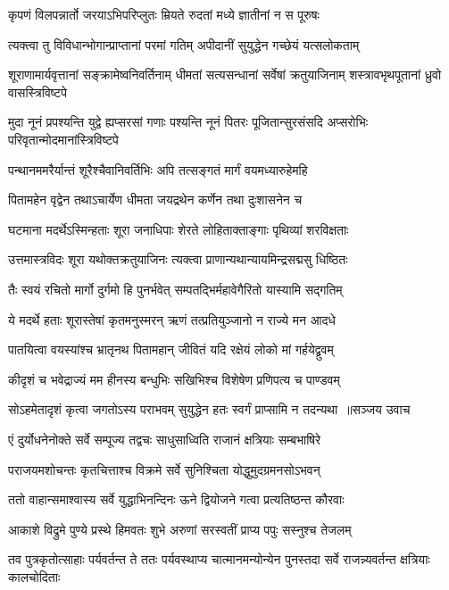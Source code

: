 \twolineshloka
{कृपणं विलपन्नार्तो जरयाऽभिपरिप्लुतः}
{म्रियते रुदतां मध्ये ज्ञातीनां न स पूरुषः}


\twolineshloka
{त्यक्त्वा तु विविधान्भोगान्प्राप्तानां परमां गतिम्}
{अपीदानीं सुयुद्धेन गच्छेयं यत्सलोकताम्}


\threelineshloka
{शूराणामार्यवृत्तानां सङ्क्रामेष्वनिवर्तिनाम्}
{धीमतां सत्यसन्धानां सर्वेषां क्रतुयाजिनाम्}
{शस्त्रावभृथपूतानां ध्रुवो वासस्त्रिविष्टपे}


मुदा नूनं प्रपश्यन्ति युद्वे ह्यप्सरसां गणाः
\twolineshloka
{पश्यन्ति नूनं पितरः पूजितान्सुरसंसदि}
{अप्सरोभिः परिवृतान्मोदमानांस्त्रिविष्टपे}


\twolineshloka
{पन्थानममरैर्यान्तं शूरैश्चैवानिवर्तिभिः}
{अपि तत्सङ्गतं मार्गं वयमध्यारुहेमहि}


\twolineshloka
{पितामहेन वृद्वेन तथाऽचार्येण धीमता}
{जयद्रथेन कर्णेन तथा दुःशासनेन च}


\twolineshloka
{घटमाना मदर्थेऽस्मिन्हताः शूरा जनाधिपाः}
{शेरते लोहिताक्ताङ्गाः पृथिव्यां शरविक्षताः}


\twolineshloka
{उत्तमास्त्रविदः शूरा यथोक्तक्रतुयाजिनः}
{त्यक्त्वा प्राणान्यथान्यायमिन्द्रसद्मसु धिष्ठितः}


\twolineshloka
{तैः स्वयं रचितो मार्गो दुर्गमो हि पुनर्भवेत्}
{सम्पतद्भिर्महावेगैरितो यास्यामि सद्गतिम्}


\twolineshloka
{ये मदर्थे हताः शूरास्तेषां कृतमनुस्मरन्}
{ऋणं तत्प्रतियुञ्जानो न राज्ये मन आदधे}


\twolineshloka
{पातयित्वा वयस्यांश्च भ्रातृनथ पितामहान्}
{जीवितं यदि रक्षेयं लोको मां गर्हयेद्व्रुवम्}


\twolineshloka
{कीदृशं च भवेद्राज्यं मम हीनस्य बन्धुभिः}
{सखिभिश्च विशेषेण प्रणिपत्य च पाण्डवम्}


\threelineshloka
{सोऽहमेतादृशं कृत्वा जगतोऽस्य पराभवम्}
{सुयुद्धेन हतः स्वर्गं प्राप्सामि न तदन्यथा ॥सञ्जय उवाच}
{}


\twolineshloka
{एं दुर्योधनेनोक्ते सर्वे सम्पूज्य तद्वचः}
{साधुसाध्विति राजानं क्षत्रियाः सम्बभाषिरे}


\twolineshloka
{पराजयमशोचन्तः कृतचित्ताश्च विक्रमे}
{सर्वे सुनिश्चिता योद्धुमुदग्रमनसोऽभवन्}


\twolineshloka
{ततो वाहान्समाश्वास्य सर्वे युद्धाभिनन्दिनः}
{ऊने द्वियोजने गत्वा प्रत्यतिष्ठन्त कौरवाः}


\twolineshloka
{आकाशे विद्रुमे पुण्ये प्रस्थे हिमवतः शुभे}
{अरुणां सरस्वतीं प्राप्य पपुः सस्नुश्च तेजलम्}


\threelineshloka
{तव पुत्रकृतोत्साहाः पर्यवर्तन्त ते ततः}
{पर्यवस्थाप्य चात्मानमन्योन्येन पुनस्तदा}
{सर्वे राजन्न्यवर्तन्त क्षत्रियाः कालचोदिताः}


